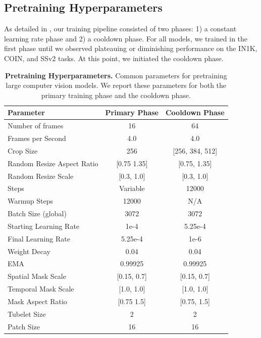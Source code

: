 \documentclass[]{fairmeta}
\begin{document}
\subsection{Pretraining Hyperparameters}
As detailed in , our training pipeline consisted of two phases: 1) a constant learning rate phase and 2) a cooldown phase.
For all models, we trained in the first phase until we observed plateauing or diminishing performance on the IN1K, COIN, and SSv2 tasks. At this point, we initiated the cooldown phase.
\begin{table}[h]
    \small
    \caption{\small{\bf Pretraining Hyperparameters.} Common parameters for pretraining large computer vision models. We report these parameters for both the primary training phase and the cooldown phase.}
    \centering
    \label{tab:pretraining_params}
    \begin{tabular}{l c c}
      \bf Parameter & \bf Primary Phase & \bf Cooldown Phase \\
        \toprule
        Number of frames & 16 & 64 \\
        Frames per Second & 4.0 & 4.0 \\
        Crop Size & 256 & [256, 384, 512] \\
        Random Resize Aspect Ratio & [0.75 1.35] & [0.75, 1.35] \\
        Random Resize Scale & [0.3, 1.0] & [0.3, 1.0] \\
        Steps & Variable & 12000 \\
        Warmup Steps & 12000 & N/A \\
        Batch Size (global) & 3072 & 3072 \\
        Starting Learning Rate & 1e-4 & 5.25e-4 \\
        Final Learning Rate & 5.25e-4 & 1e-6  \\
        Weight Decay & 0.04 & 0.04 \\
        EMA & 0.99925 & 0.99925 \\
        Spatial Mask Scale & [0.15, 0.7] & [0.15, 0.7] \\
        Temporal Mask Scale & [1.0, 1.0] & [1.0, 1.0] \\
        Mask Aspect Ratio & [0.75 1.5] & [0.75, 1.5] \\
        Tubelet Size & 2 & 2 \\
        Patch Size & 16 & 16 \\
        \bottomrule
    \end{tabular}
\end{table}
\end{document}
